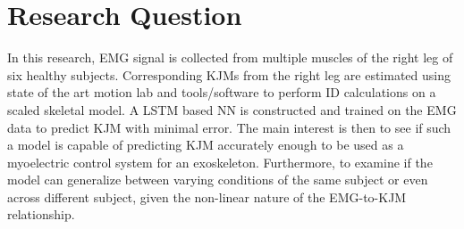 \documentclass[../main.tex]{subfiles}
\begin{document}
\section{Research Question}
In this research, \ac{EMG} signal is collected from multiple muscles of the right leg of six healthy subjects. 
Corresponding \acp{KJM} from the right leg are estimated using state of the art motion lab and tools/software to perform \ac{ID} calculations on a scaled skeletal model.
A \ac{LSTM} based \ac{NN} is constructed and trained on the \ac{EMG} data to predict \ac{KJM} with minimal error.
The main interest is then to see if such a model is capable of predicting \ac{KJM} accurately enough to be used as a myoelectric control system for an exoskeleton.
Furthermore, to examine if the model can generalize between varying conditions of the same subject or even across different subject, given the non-linear nature of the \ac{EMG}-to-\ac{KJM} relationship.
\end{document}
